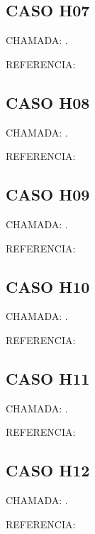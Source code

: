 \documentclass{undftex}
\begin{document}
\begin{refsection}\section*{CASO H07} CHAMADA: . \textcite{H07a}\par REFERENCIA:\par\printbibliography[heading=none,check=undfconsultadas]\end{refsection}\clearpage
\begin{refsection}\section*{CASO H08} CHAMADA: . \textcite{H08a}\par REFERENCIA:\par\printbibliography[heading=none,check=undfconsultadas]\end{refsection}\clearpage
\begin{refsection}\section*{CASO H09} CHAMADA: . \textcite{H09a}\par REFERENCIA:\par\printbibliography[heading=none,check=undfconsultadas]\end{refsection}\clearpage
\begin{refsection}\section*{CASO H10} CHAMADA: . \textcite{H10a}\par REFERENCIA:\par\printbibliography[heading=none,check=undfconsultadas]\end{refsection}\clearpage
\begin{refsection}\section*{CASO H11} CHAMADA: . \textcite{H11a}\par REFERENCIA:\par\printbibliography[heading=none,check=undfconsultadas]\end{refsection}\clearpage
\begin{refsection}\section*{CASO H12} CHAMADA: . \textcite{H12a}\par REFERENCIA:\par\printbibliography[heading=none,check=undfconsultadas]\end{refsection}\clearpage
\end{document}
